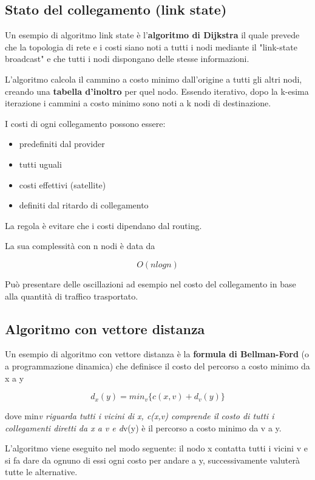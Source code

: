 \documentclass{report}
\begin{document}
\hypertarget{header-n179}{%
\subsection{Stato del collegamento (link state)}\label{header-n179}}

Un esempio di algoritmo link state è l'\textbf{algoritmo di Dijkstra} il
quale prevede che la topologia di rete e i costi siano noti a tutti i
nodi mediante il "link-state broadcast" e che tutti i nodi dispongano
delle stesse informazioni.

L'algoritmo calcola il cammino a costo minimo dall'origine a tutti gli
altri nodi, creando una \textbf{tabella d'inoltro} per quel nodo.
Essendo iterativo, dopo la k-esima iterazione i cammini a costo minimo
sono noti a k nodi di destinazione.

I costi di ogni collegamento possono essere:

\begin{itemize}
\item
  predefiniti dal provider
\item
  tutti uguali
\item
  costi effettivi (satellite)
\item
  definiti dal ritardo di collegamento
\end{itemize}

La regola è evitare che i costi dipendano dal routing.

La sua complessità con n nodi è data da

\[O(nlogn)\]

Può presentare delle oscillazioni ad esempio nel costo del collegamento
in base alla quantità di traffico trasportato.

\hypertarget{header-n196}{%
\subsection{Algoritmo con vettore distanza}\label{header-n196}}

Un esempio di algoritmo con vettore distanza è la \textbf{formula di
Bellman-Ford} (o a programmazione dinamica) che definisce il costo del
percorso a costo minimo da x a y

\[d_x(y) = min_v\{c(x,v) + d_v(y)\}\]

dove min\emph{v riguarda tutti i vicini di x, c(x,v) comprende il costo
di tutti i collegamenti diretti da x a v e d}v(y) è il percorso a costo
minimo da v a y.

L'algoritmo viene eseguito nel modo seguente: il nodo x contatta tutti i
vicini v e si fa dare da ognuno di essi ogni costo per andare a y,
successivamente valuterà tutte le alternative.
\end{document}
